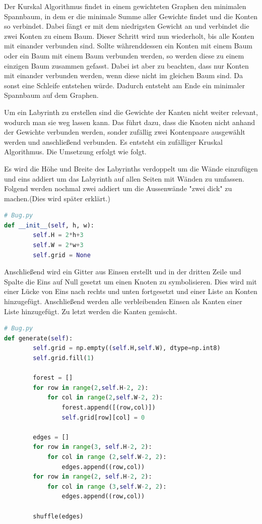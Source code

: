 \documentclass[11pt, a4paper]{article}
\begin{document}
\bigskip

Der Kurskal Algorithmus findet in einem gewichteten Graphen den minimalen Spannbaum, in dem er die minimale Summe aller Gewichte findet und die Konten so verbindet. Dabei fängt er mit dem niedrigsten Gewicht an und verbindet die zwei Konten zu einem Baum. Dieser Schritt wird nun wiederholt, bis alle Konten mit einander verbunden sind. Sollte währenddessen ein Konten mit einem Baum oder ein Baum mit einem Baum verbunden werden, so werden diese zu einem einzigen Baum zusammen gefasst. Dabei ist aber zu beachten, dass nur Konten mit einander verbunden werden, wenn diese nicht im gleichen Baum sind. Da sonst eine Schleife entstehen würde. Dadurch entsteht am Ende ein minimaler Spannbaum auf dem Graphen.  

\bigskip

Um ein Labyrinth zu erstellen sind die Gewichte der Kanten nicht weiter relevant, wodurch man sie weg lassen kann. Das führt dazu, dass die Knoten nicht anhand der Gewichte verbunden werden, sonder zufällig zwei Kontenpaare ausgewählt werden und anschließend verbunden. Es entsteht ein zufälliger Kruskal Algorithmus.
Die Umsetzung erfolgt wie folgt.


Es wird die Höhe und Breite des Labyrinths verdoppelt um die Wände einzufügen und eins addiert um das Labyrinth auf allen Seiten mit Wänden zu umfassen. Folgend werden nochmal zwei addiert um die Aussenwände "zwei dick" zu machen.(Dies wird später erklärt.)
\begin{lstlisting}[language = Python]
# Bug.py
def __init__(self, h, w):
        self.H = 2*h+3
        self.W = 2*w+3
        self.grid = None
\end{lstlisting}

Anschließend wird ein Gitter aus Einsen erstellt und in der dritten Zeile und Spalte die Eins auf Null gesetzt um einen Knoten zu symbolisieren. Dies wird mit einer Lücke von Eins nach rechts und unten fortgesetzt und einer Liste an Konten hinzugefügt. Anschließend werden alle verbleibenden Einsen als Kanten einer Liste hinzugefügt. Zu letzt werden die Kanten gemischt.

\begin{lstlisting}[language = Python]
# Bug.py
def generate(self):
        self.grid = np.empty((self.H,self.W), dtype=np.int8)
        self.grid.fill(1)
        
        forest = []
        for row in range(2,self.H-2, 2):
            for col in range(2,self.W-2, 2):
                forest.append([(row,col)])
                self.grid[row][col] = 0
        
        edges = []
        for row in range(3, self.H-2, 2):
            for col in range (2,self.W-2, 2):
                edges.append((row,col))
        for row in range(2, self.H-2, 2):
            for col in range (3,self.W-2, 2):
                edges.append((row,col))
        
        shuffle(edges)
\end{lstlisting}
\end{document}
